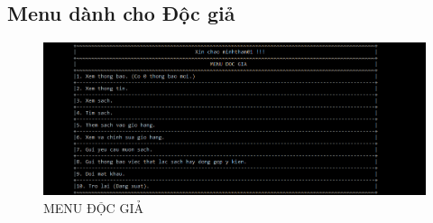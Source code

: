 \documentclass[16pt,a4paper,oneside]{article}
\begin{document}
\subsection{Menu dành cho Độc giả}
\begin{figure}[htp]
	\begin{center}
		\includegraphics[width=18cm]{Images/menu_docgia.png}
		\caption{MENU ĐỘC GIẢ}
	\end{center}
\end{figure}
\end{document}
